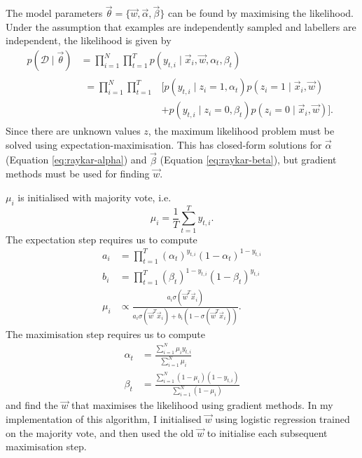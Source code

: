             The model parameters $\vec \theta = \{\vec w, \vec \alpha, \vec \beta\}$ can be found by maximising the likelihood. Under the assumption that examples are independently sampled and labellers are independent, the likelihood is given by
            \begin{align*}
                p(\mathcal D \mid \vec \theta) &= \prod_{i = 1}^N \prod_{t = 1}^T p(y_{t, i} \mid \vec x_i, \vec w, \alpha_t, \beta_t)\\
                &\begin{aligned}= \prod_{i = 1}^N \prod_{t = 1}^T &\bigg[p(y_{t, i} \mid z_i = 1, \alpha_t) p(z_i = 1 \mid \vec x_i, \vec w)\\
                    &+ p(y_{t, i} \mid z_i = 0, \beta_t) p(z_i = 0 \mid \vec x_i, \vec w)\bigg].\end{aligned}
            \end{align*}
            Since there are unknown values $z$, the maximum likelihood problem must be solved using expectation-maximisation. This has closed-form solutions for $\vec \alpha$ (Equation \ref{eq:raykar-alpha}) and $\vec \beta$ (Equation \ref{eq:raykar-beta}), but gradient methods must be used for finding $\vec w$.

            $\mu_i$ is initialised with majority vote, i.e.
            \begin{equation*}
                \mu_i = \frac{1}{T} \sum_{t = 1}^T y_{t, i}.
            \end{equation*}
            The expectation step requires us to compute
            \begin{align*}
                a_i &= \prod_{t = 1}^T (\alpha_t)^{y_{t, i}} (1 - \alpha_t)^{1 - y_{t, i}}\\
                b_i &= \prod_{t = 1}^T (\beta_t)^{1 - y_{t, i}} (1 - \beta_t)^{y_{t, i}}\\
                \mu_i &\propto \frac{a_i \sigma(\vec w^T \vec x_i)}{a_i \sigma(\vec w^T \vec x_i) + b_i (1 - \sigma(\vec w^T \vec x_i))}.
            \end{align*}
            The maximisation step requires us to compute
            \begin{align}
                \label{eq:raykar-alpha}
                \alpha_t &= \frac{\sum_{i = 1}^N \mu_i y_{t, i}}{\sum_{i = 1}^N \mu_i}\\
                \label{eq:raykar-beta}
                \beta_t &= \frac{\sum_{i = 1}^N (1 - \mu_i) (1 - y_{t, i})}{\sum_{i = 1}^N (1 - \mu_i)}
            \end{align}
            and find the $\vec w$ that maximises the likelihood using gradient methods. In my implementation of this algorithm, I initialised $\vec w$ using logistic regression trained on the majority vote, and then used the old $\vec w$ to initialise each subsequent maximisation step.

